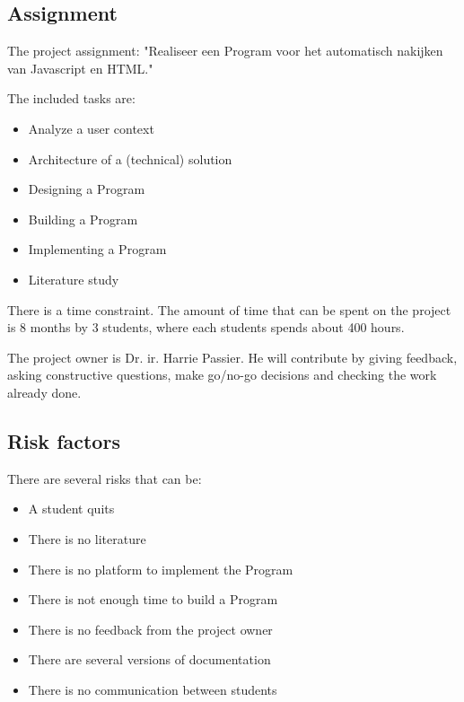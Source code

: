 \documentclass{article}
\begin{document}
\subsection{Assignment}

The project assignment: "Realiseer een Program voor het automatisch nakijken van Javascript en HTML."

The included tasks are:
\begin{itemize}
  \item Analyze a user context
  \item Architecture of a (technical) solution
  \item Designing a Program
  \item Building a Program
  \item Implementing a Program
  \item Literature study
\end{itemize}

There is a time constraint. The amount of time that can be spent on the project is 8 months by 3 students, where each students spends about 400 hours.

The project owner is Dr. ir. Harrie Passier. He will contribute by giving feedback, asking constructive questions, make go/no-go decisions and checking the work already done.

\subsection{Risk factors}

There are several risks that can be:
\begin{itemize}
  \item A student quits
  \item There is no literature
  \item There is no platform to implement the Program
  \item There is not enough time to build a Program
  \item There is no feedback from the project owner
  \item There are several versions of documentation
  \item There is no communication between students
\end{itemize}
\end{document}
